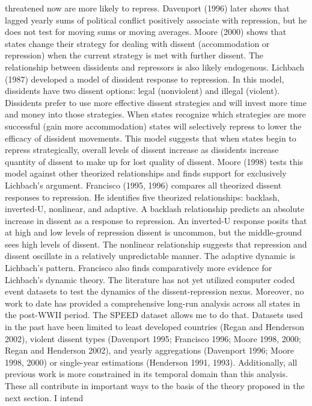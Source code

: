 \documentclass[ignorenonframetext,]{beamer}
\begin{document}
\begin{frame}[fragile]
threatened now are more likely to repress. Davenport (1996) later shows
that lagged yearly sums of political conflict positively associate with
repression, but he does not test for moving sums or moving averages.
Moore (2000) shows that states change their strategy for dealing with
dissent (accommodation or repression) when the current strategy is met
with further dissent. The relationship between dissidents and repressors
is also likely endogenous. Lichbach (1987) developed a model of
dissident response to repression. In this model, dissidents have two
dissent options: legal (nonviolent) and illegal (violent). Dissidents
prefer to use more effective dissent strategies and will invest more
time and money into those strategies. When states recognize which
strategies are more successful (gain more accommodation) states will
selectively repress to lower the efficacy of dissident movements. This
model suggests that when states begin to repress strategically, overall
levels of dissent increase as dissidents increase quantity of dissent to
make up for lost quality of dissent. Moore (1998) tests this model
against other theorized relationships and finds support for exclusively
Lichbach's argument. Francisco (1995, 1996) compares all theorized
dissent responses to repression. He identifies five theorized
relationships: backlash, inverted-U, nonlinear, and adaptive. A backlash
relationship predicts an absolute increase in dissent as a response to
repression. An inverted-U response posits that at high and low levels of
repression dissent is uncommon, but the middle-ground sees high levels
of dissent. The nonlinear relationship suggests that repression and
dissent oscillate in a relatively unpredictable manner. The adaptive
dynamic is Lichbach's pattern. Francisco also finds comparatively more
evidence for Lichbach's dynamic theory. The literature has not yet
utilized computer coded event datasets to test the dynamics of the
dissent-repression nexus. Moreover, no work to date has provided a
comprehensive long-run analysis across all states in the post-WWII
period. The SPEED dataset allows me to do that. Datasets used in the
past have been limited to least developed countries (Regan and Henderson
2002), violent dissent types (Davenport 1995; Francisco 1996; Moore
1998, 2000; Regan and Henderson 2002), and yearly aggregations
(Davenport 1996; Moore 1998, 2000) or single-year estimations (Henderson
1991, 1993). Additionally, all previous work is more constrained in its
temporal domain than this analysis. These all contribute in important
ways to the basis of the theory proposed in the next section. I intend

\end{frame}
\end{document}
